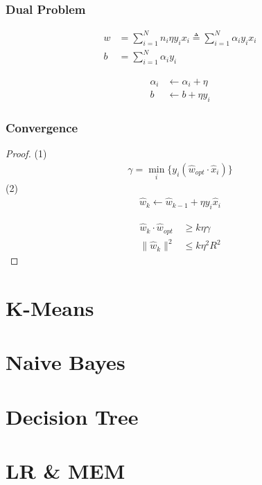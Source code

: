 \documentclass[11pt]{article}
\begin{document}
\begin{CJK*}{UTF8}{gbsn}
\subsubsection{Dual Problem}
\begin{align*}
	w &= \sum_{i=1}^N n_i\eta y_ix_i \triangleq \sum_{i=1}^N \alpha_iy_ix_i\\
	b &= \sum_{i=1}^N \alpha_iy_i
\end{align*}

\begin{align*}
	\alpha_i &\leftarrow \alpha_i + \eta\\
	b &\leftarrow b + \eta y_i
\end{align*}

\subsubsection{Convergence}
\begin{proof}
(1) 
\begin{align*}
	\gamma = \min_{i}\{y_i(\hat{w}_{opt}\cdot \hat{x}_{i})\}
\end{align*}
(2) 
\begin{align*}
	\hat{w}_k \leftarrow \hat{w}_{k-1} + \eta y_i\hat{x}_i
\end{align*}

\begin{align*}
	\hat{w}_k \cdot \hat{w}_{opt} &\ge k\eta\gamma \\
	 \|\hat{w}_k\|^2  &\le k\eta^2R^2
\end{align*}
\end{proof}

\section{K-Means}

\section{Naive Bayes}

\section{Decision Tree}

\section{LR \& MEM}


\end{CJK*}
\end{document}

